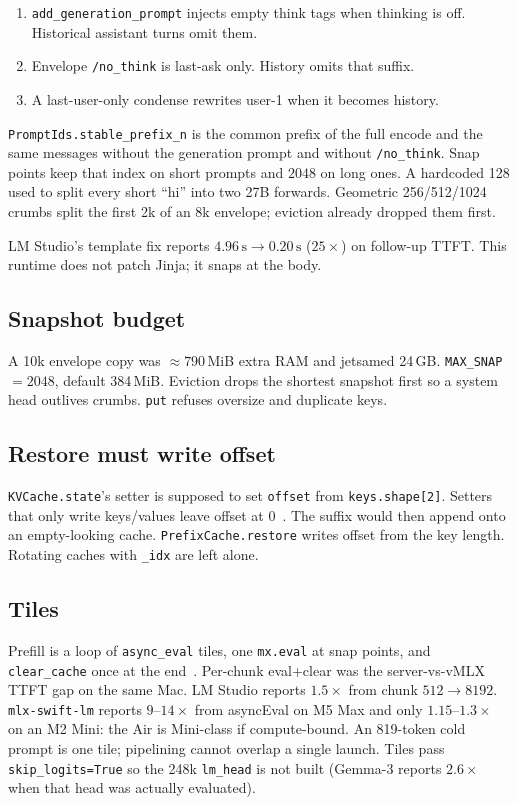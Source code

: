 \begin{enumerate}[leftmargin=1.4em]
\item \texttt{add\_generation\_prompt} injects empty think tags when thinking is off. Historical assistant turns omit them.
\item Envelope \texttt{/no\_think} is last-ask only. History omits that suffix.
\item A last-user-only condense rewrites user-1 when it becomes history.
\end{enumerate}

\texttt{PromptIds.stable\_prefix\_n} is the common prefix of the full encode and the same messages without the generation prompt and without \texttt{/no\_think}. Snap points keep that index on short prompts and $2048$ on long ones. A hardcoded 128 used to split every short ``hi'' into two 27B forwards. Geometric 256/512/1024 crumbs split the first 2k of an 8k envelope; eviction already dropped them first.

LM Studio's template fix reports $4.96\,\mathrm{s} \to 0.20\,\mathrm{s}$ ($25\times$) on follow-up TTFT. This runtime does not patch Jinja; it snaps at the body.

\subsection{Snapshot budget}

A 10k envelope copy was $\approx 790$\,MiB extra RAM and jetsamed 24\,GB. \texttt{MAX\_SNAP}${}=2048$, default 384\,MiB. Eviction drops the shortest snapshot first so a system head outlives crumbs. \texttt{put} refuses oversize and duplicate keys.

\subsection{Restore must write offset}

\texttt{KVCache.state}'s setter is supposed to set \texttt{offset} from \texttt{keys.shape[2]}. Setters that only write keys/values leave offset at 0~\citep{mlxlm1162}. The suffix would then append onto an empty-looking cache. \texttt{PrefixCache.restore} writes offset from the key length. Rotating caches with \texttt{\_idx} are left alone.

\subsection{Tiles}

Prefill is a loop of \texttt{async\_eval} tiles, one \texttt{mx.eval} at snap points, and \texttt{clear\_cache} once at the end~\citep{mlxvlm945}. Per-chunk eval+clear was the server-vs-vMLX TTFT gap on the same Mac. LM Studio reports $1.5\times$ from chunk $512\to 8192$. \texttt{mlx-swift-lm} reports $9$--$14\times$ from asyncEval on M5 Max and only $1.15$--$1.3\times$ on an M2 Mini: the Air is Mini-class if compute-bound. An 819-token cold prompt is one tile; pipelining cannot overlap a single launch. Tiles pass \texttt{skip\_logits=True} so the 248k \texttt{lm\_head} is not built (Gemma-3 reports $2.6\times$ when that head was actually evaluated).

